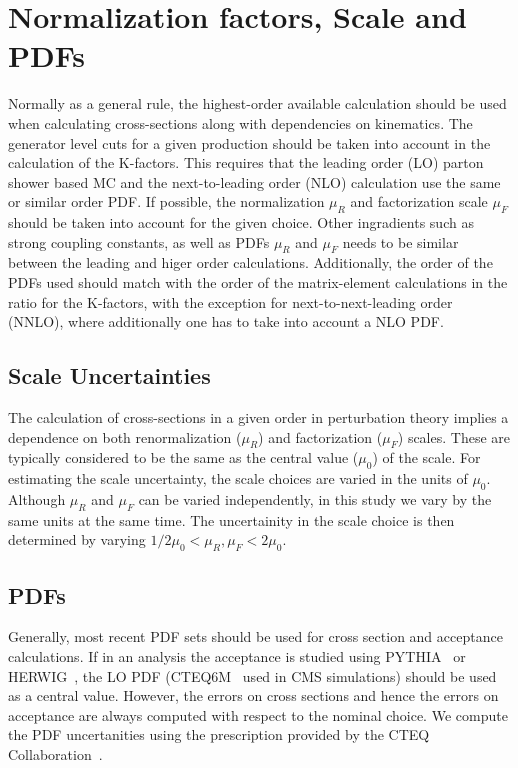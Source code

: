\section{Normalization factors, Scale and PDFs}
\label{sec:normalization}

Normally as a general rule, the highest-order available calculation should be used when calculating cross-sections 
along with dependencies on kinematics. The generator level cuts for a given production should be taken into
account in the calculation of the K-factors. This requires that the leading order (LO) parton shower based MC and the 
next-to-leading order (NLO) calculation use the same or similar order PDF. If possible, the normalization $\mu_R$ and 
factorization scale $\mu_F$ should be taken into account for the given choice. Other ingradients such as strong 
coupling constants, as well as PDFs $\mu_R$ and $\mu_F$ needs to be similar between the leading and higer order calculations. 
Additionally, the order of the PDFs used should match with the order of the matrix-element calculations in the 
ratio for the K-factors, with the exception for next-to-next-leading order (NNLO), where additionally one has 
to take into account a NLO PDF. 

\subsection{Scale Uncertainties}

The calculation of cross-sections in a given order in perturbation theory implies a dependence on both 
renormalization ($\mu_R$) and factorization ($\mu_F$) scales. These are typically considered to be the same 
as the central value ($\mu_0$) of the scale.  For estimating the scale uncertainty, the scale choices are varied 
in the units of $\mu_0$. Although $\mu_R$ and $\mu_F$ can be varied independently, in this study
we vary by the same units at the same time. The uncertainity in the scale choice is then determined
by varying $1/2 \mu_0 < \mu_R, \mu_F < 2\mu_0$. 

\subsection{PDFs}

Generally, most recent PDF sets should be used for cross section and acceptance calculations. If in an analysis 
the acceptance is studied using PYTHIA~\cite{Pythia} or HERWIG~\cite{Herwig}, the LO PDF (CTEQ6M~\cite{cteq6m} used 
in CMS simulations) should be used as a central value. However, the errors on cross sections and hence the errors on 
acceptance are always computed with respect to the nominal choice. We compute the PDF
uncertanities using the prescription provided by the CTEQ Collaboration~\cite{cteq6m}. 

